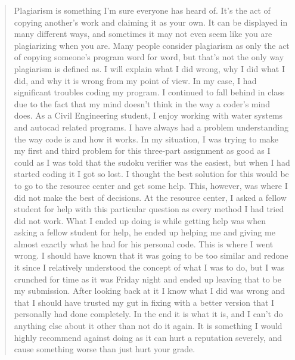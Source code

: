 \documentclass[12pt]{scrartcl}
\begin{document}
\begin{quote}
Plagiarism is something I'm sure everyone has heard of. It's the act of copying another's work and claiming it as your own. It can be displayed in many different ways, and sometimes it may not even seem like you are plagiarizing when you are. Many people consider plagiarism as only the act of copying someone's program word for word, but that's not the only way plagiarism is defined as. I will explain what I did wrong, why I did what I did, and why it is wrong from my point of view.
In my case, I had significant troubles coding my program. I continued to fall behind in class due to the fact that my mind doesn't think in the way a coder's mind does. As a Civil Engineering student, I enjoy working with water systems and autocad related programs. I have always had a problem understanding the way code is and how it works. In my situation, I was trying to make my first and third problem for this three-part assignment as good as I could as I was told that the sudoku verifier was the easiest, but when I had started coding it I got so lost. I thought the best solution for this would be to go to the resource center and get some help. This, however, was where I did not make the best of decisions.
At the resource center, I asked a fellow student for help with this particular question as every method I had tried did not work. What I ended up doing is while getting help was when asking a fellow student for help, he ended up helping me and giving me almost exactly what he had for his personal code. This is where I went wrong. I should have known that it was going to be too similar and redone it since I relatively understood the concept of what I was to do, but  I was crunched for time as it was Friday night and ended up leaving that to be my submission. After looking back at it I know what I did was wrong and that I should have trusted my gut in fixing with a better version that I personally had done completely. In the end it is what it is, and I can't do anything else about it other than not do it again. It is something I would highly recommend against doing as it can hurt a reputation severely, and cause something worse than just hurt your grade.
\end{quote}
\end{document}
